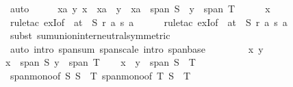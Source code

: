 \begin{isabellebody}
\ auto\isanewline
\ \ \isamarkupfalse%
\ \isamarkupfalse%
\ {\isachardoublequoteopen}{\isasymexists}xa\ y{\isachardot}{\kern0pt}\ x\ {\isacharequal}{\kern0pt}\ xa\ {\isacharplus}{\kern0pt}\ y\ {\isasymand}\ xa\ {\isasymin}\ span\ S\ {\isasymand}\ y\ {\isasymin}\ span\ T{\isachardoublequoteclose}\isanewline
\ \ \ \ \isamarkupfalse%
\ x\isanewline
\ \ \ \ \isamarkupfalse%
\ {\isacharparenleft}{\kern0pt}rule{\isacharunderscore}{\kern0pt}tac\ exI{\isacharbrackleft}{\kern0pt}of\ {\isacharunderscore}{\kern0pt}\ {\isachardoublequoteopen}{\isasymSum}a{\isasymin}t\ {\isasyminter}\ S{\isachardot}{\kern0pt}\ r\ a\ {\isacharasterisk}{\kern0pt}s\ a{\isachardoublequoteclose}{\isacharbrackright}{\kern0pt}{\isacharparenright}{\kern0pt}\isanewline
\ \ \ \ \isamarkupfalse%
\ {\isacharparenleft}{\kern0pt}rule{\isacharunderscore}{\kern0pt}tac\ exI{\isacharbrackleft}{\kern0pt}of\ {\isacharunderscore}{\kern0pt}\ {\isachardoublequoteopen}{\isasymSum}a{\isasymin}t\ {\isacharminus}{\kern0pt}\ S{\isachardot}{\kern0pt}\ r\ a\ {\isacharasterisk}{\kern0pt}s\ a{\isachardoublequoteclose}{\isacharbrackright}{\kern0pt}{\isacharparenright}{\kern0pt}\isanewline
\ \ \ \ \isamarkupfalse%
\ {\isacharparenleft}{\kern0pt}subst\ sum{\isachardot}{\kern0pt}union{\isacharunderscore}{\kern0pt}inter{\isacharunderscore}{\kern0pt}neutral{\isacharbrackleft}{\kern0pt}symmetric{\isacharbrackright}{\kern0pt}{\isacharparenright}{\kern0pt}\isanewline
\ \ \ \ \isamarkupfalse%
\ {\isacharparenleft}{\kern0pt}auto\ intro{\isacharbang}{\kern0pt}{\isacharcolon}{\kern0pt}\ span{\isacharunderscore}{\kern0pt}sum\ span{\isacharunderscore}{\kern0pt}scale\ intro{\isacharcolon}{\kern0pt}\ span{\isacharunderscore}{\kern0pt}base{\isacharparenright}{\kern0pt}\isanewline
\ \ \ \ \isamarkupfalse%
\isanewline
{}\isamarkupfalse%
\isanewline
\ \ \isamarkupfalse%
\ x\ y\ \isamarkupfalse%
{\isachardoublequoteopen}x\ {\isasymin}\ span\ S{\isachardoublequoteclose}\ {\isachardoublequoteopen}y\ {\isasymin}\ span\ T{\isachardoublequoteclose}\ \isamarkupfalse%
\ \isamarkupfalse%
\ {\isachardoublequoteopen}x\ {\isacharplus}{\kern0pt}\ y\ {\isasymin}\ span\ {\isacharparenleft}{\kern0pt}S\ {\isasymunion}\ T{\isacharparenright}{\kern0pt}{\isachardoublequoteclose}\isanewline
\ \ \ \ \isamarkupfalse%
\ span{\isacharunderscore}{\kern0pt}mono{\isacharbrackleft}{\kern0pt}of\ S\ {\isachardoublequoteopen}S\ {\isasymunion}\ T{\isachardoublequoteclose}{\isacharbrackright}{\kern0pt}\ span{\isacharunderscore}{\kern0pt}mono{\isacharbrackleft}{\kern0pt}of\ T\ {\isachardoublequoteopen}S\ {\isasymunion}\ T{\isachardoublequoteclose}{\isacharbrackright}{\kern0pt}\isanewline

\end{isabellebody}
